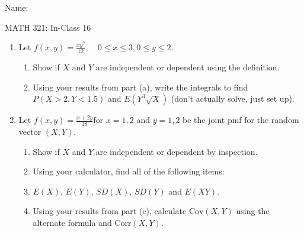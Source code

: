 \documentclass{article}
\newcommand{\cov}[1]{\mathrm{Cov}(#1)}		%
\newcommand{\corr}[1]{\mathrm{Corr}(#1)}		%
\begin{document}
\hspace{375pt}Name:

\begin{center}
{\Huge MATH 321: In-Class 16}
\end{center}

\bigskip\bigskip


\begin{enumerate}
    \item Let $\displaystyle f(x,y) = \frac{xy^2}{12}, \quad 0 \le x \le 3, 0 \le y \le 2$.%
    \begin{enumerate}
        \item Show if $X$ and $Y$ are independent or dependent using the definition.\vspace{100pt}
        \item Using your results from part (a), write the integrals to find $P(X > 2, Y < 1.5)$ and $E(Y^3\sqrt{X})$ (don't actually solve, just set up).\vspace{50pt}
    \end{enumerate}
    
    \item Let $\displaystyle f(x,y) = \frac{x + 2y}{18}$\quad for $x = 1, 2$ and $y = 1, 2$ be the joint pmf for the random vector $(X,Y)$.%
    \begin{enumerate}
        \item Show if $X$ and $Y$ are independent or dependent by inspection.\vspace{50pt}
        \item Using your calculator, find all of the following items:
        \item[] $E(X)$, $E(Y)$, $SD(X)$, $SD(Y)$ and $E(XY)$.\vspace{150pt}
        \item Using your results from part (c), calculate $\cov{X,Y}$ using the alternate formula and $\corr{X,Y}$.\vspace{100pt}
    \end{enumerate}
    
\end{enumerate}
\end{document}
